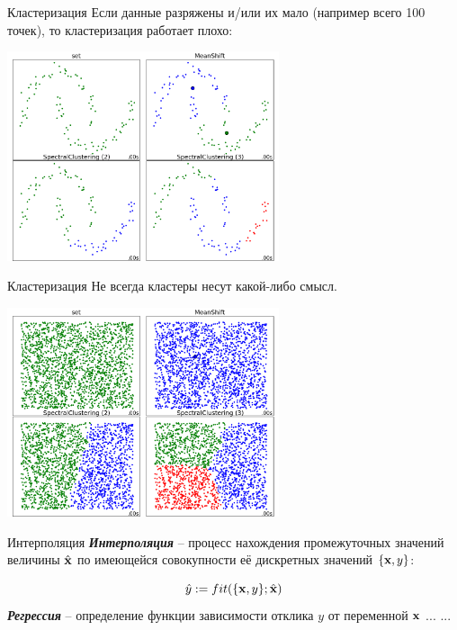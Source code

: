 \documentclass{beamer}
\newcommand{\termdef}[1]{\textbf{\textit{#1}}}
\begin{document}
   \begin{frame}{Кластеризация}
   Если данные разряжены и/или их мало (например всего 100 точек), то кластеризация работает плохо:
   \begin{center}
   	\includegraphics[width=8cm]{../pic/clustering_example_2.png}
   \end{center}
	\end{frame}

   \begin{frame}{Кластеризация}
   Не всегда кластеры несут какой-либо смысл.
	\begin{center}
		\includegraphics[width=8cm]{../pic/clustering_example_3.png}
	\end{center}
	\end{frame}

	\begin{frame}{Интерполяция}
	\termdef{Интерполяция} -- процесс нахождения промежуточных значений величины 
	$\hat {\bold x}$ 	
	по имеющейся совокупности её дискретных значений 
	$\{ \bold x, y\}$:
	
	\begin{equation}
	\hat y := fit(\{ \bold x, y\}; \hat {\bold x})
	\end{equation}
	\termdef{Регрессия} -- определение функции зависимости отклика $y$ от переменной $\bold x$ ... ... 
	\end{frame}
   
\end{document}
